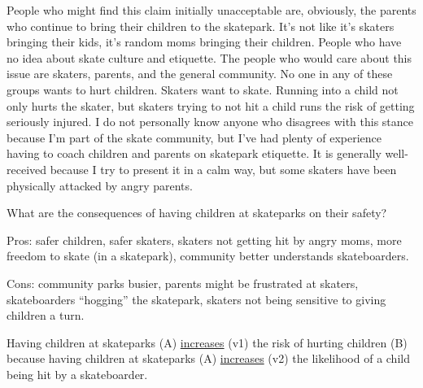 \documentclass[12pt]{article}
\begin{document}
People who might find this claim initially unacceptable are, obviously, the parents who continue to bring their children to the skatepark. It's not like it's skaters bringing their kids, it's random moms bringing their children. People who have no idea about skate culture and etiquette. The people who would care about this issue are skaters, parents, and the general community. No one in any of these groups wants to hurt children. Skaters want to skate. Running into a child not only hurts the skater, but skaters trying to not hit a child runs the risk of getting seriously injured. I do not personally know anyone who disagrees with this stance because I'm part of the skate community, but I've had plenty of experience having to coach children and parents on skatepark etiquette. It is generally well-received because I try to present it in a calm way, but some skaters have been physically attacked by angry parents.


What are the consequences of having children at skateparks on their safety?

Pros: safer children, safer skaters, skaters not getting hit by angry moms, more freedom to skate (in a skatepark), community better understands skateboarders.

Cons: community parks busier, parents might be frustrated at skaters, skateboarders ``hogging'' the skatepark, skaters not being sensitive to giving children a turn.

Having children at skateparks (A) \uline{increases} (v1) the risk of hurting children (B) because having children at skateparks (A) \uline{increases} (v2) the likelihood of a child being hit by a skateboarder.

\end{document}
